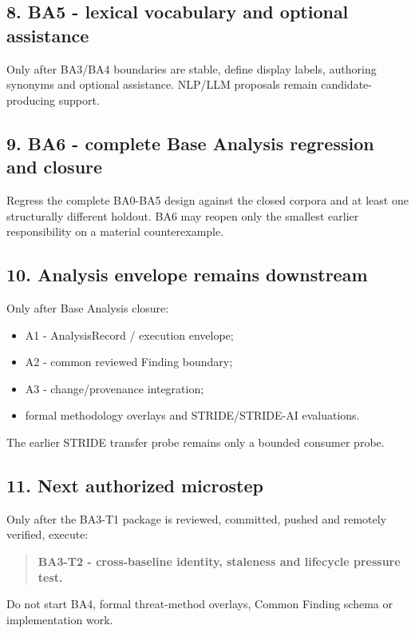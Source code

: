 \documentclass[11pt,a4paper]{article}
\providecommand{\tightlist}{\setlength{\itemsep}{0pt}\setlength{\parskip}{0pt}}
\begin{document}
\subsection{8. BA5 - lexical vocabulary and optional assistance}\label{8-ba5---lexical-vocabulary-and-optional-assistance}

Only after BA3/BA4 boundaries are stable, define display labels, authoring synonyms and optional assistance. NLP/LLM proposals remain candidate-producing support.

\subsection{9. BA6 - complete Base Analysis regression and closure}\label{9-ba6---complete-base-analysis-regression-and-closure}

Regress the complete BA0-BA5 design against the closed corpora and at least one structurally different holdout. BA6 may reopen only the smallest earlier responsibility on a material counterexample.

\subsection{10. Analysis envelope remains downstream}\label{10-analysis-envelope-remains-downstream}

Only after Base Analysis closure:

\begin{itemize}
\tightlist
\item
  A1 - AnalysisRecord / execution envelope;
\item
  A2 - common reviewed Finding boundary;
\item
  A3 - change/provenance integration;
\item
  formal methodology overlays and STRIDE/STRIDE-AI evaluations.
\end{itemize}

The earlier STRIDE transfer probe remains only a bounded consumer probe.

\subsection{11. Next authorized microstep}\label{11-next-authorized-microstep}

Only after the BA3-T1 package is reviewed, committed, pushed and remotely verified, execute:

\begin{quote}
\textbf{BA3-T2 - cross-baseline identity, staleness and lifecycle pressure test.}
\end{quote}

Do not start BA4, formal threat-method overlays, Common Finding schema or implementation work.
\end{document}
